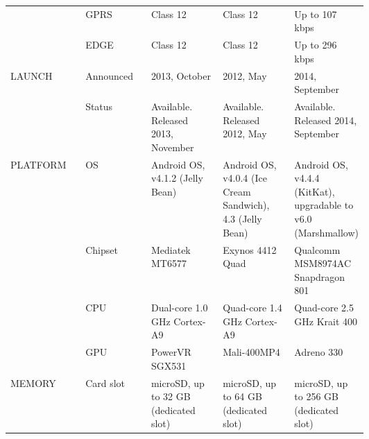 \begin{longtable}{llp{0.2\linewidth}p{0.2\linewidth}p{0.2\linewidth}}
		& GPRS          & Class 12                                        & Class 12                                                                                    & Up to 107 kbps                                                                                                 \\
		& EDGE          & Class 12                                        & Class 12                                                                                    & Up to 296 kbps                                                                                                 \\ \hline
		LAUNCH   & Announced     & 2013, October                                   & 2012, May                                                                                   & 2014, September                                                                                                \\
		& Status        & Available. Released 2013, November              & Available. Released 2012, May                                                               & Available. Released 2014, September                                                                            \\ \hline
		PLATFORM & OS            & Android OS, v4.1.2 (Jelly Bean)                 & Android OS, v4.0.4 (Ice Cream Sandwich), 4.3 (Jelly Bean)                                   & Android OS, v4.4.4 (KitKat), upgradable to v6.0 (Marshmallow)                                                  \\
		& Chipset       & Mediatek MT6577                                 & Exynos 4412 Quad                                                                            & Qualcomm MSM8974AC Snapdragon 801                                                                              \\
		& CPU           & Dual-core 1.0 GHz Cortex-A9                     & Quad-core 1.4 GHz Cortex-A9                                                                 & Quad-core 2.5 GHz Krait 400                                                                                    \\
		& GPU           & PowerVR SGX531                                  & Mali-400MP4                                                                                 & Adreno 330                                                                                                     \\ \hline
		MEMORY   & Card slot     & microSD, up to 32 GB (dedicated slot)           & microSD, up to 64 GB (dedicated slot)                                                       & microSD, up to 256 GB (dedicated slot)                                                                         \\

\end{longtable}

